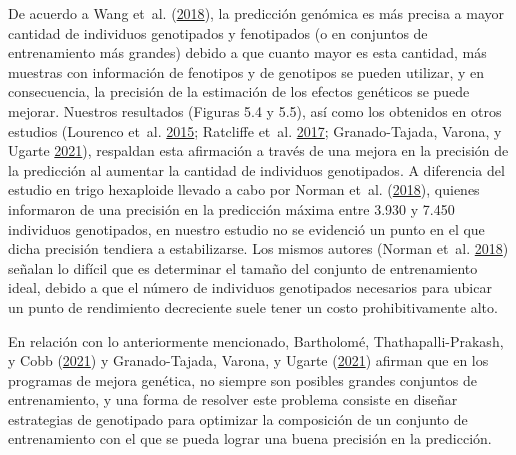\documentclass[11pt,spanish,a4paper,oneside,]{book} %
\begin{document}
De acuerdo a Wang et~al. (\protect\hyperlink{ref-cite:77}{2018}), la predicción genómica es más precisa a mayor cantidad de individuos genotipados y fenotipados (o en conjuntos de entrenamiento más grandes) debido a que cuanto mayor es esta cantidad, más muestras con información de fenotipos y de genotipos se pueden utilizar, y en consecuencia, la precisión de la estimación de los efectos genéticos se puede mejorar. Nuestros resultados (Figuras 5.4 y 5.5), así como los obtenidos en otros estudios (Lourenco et~al. \protect\hyperlink{ref-cite:87}{2015}; Ratcliffe et~al. \protect\hyperlink{ref-cite:72}{2017}; Granado-Tajada, Varona, y Ugarte \protect\hyperlink{ref-cite:88}{2021}), respaldan esta afirmación a través de una mejora en la precisión de la predicción al aumentar la cantidad de individuos genotipados. A diferencia del estudio en trigo hexaploide llevado a cabo por Norman et~al. (\protect\hyperlink{ref-cite:78}{2018}), quienes informaron de una precisión en la predicción máxima entre 3.930 y 7.450 individuos genotipados, en nuestro estudio no se evidenció un punto en el que dicha precisión tendiera a estabilizarse. Los mismos autores (Norman et~al. \protect\hyperlink{ref-cite:78}{2018}) señalan lo difícil que es determinar el tamaño del conjunto de entrenamiento ideal, debido a que el número de individuos genotipados necesarios para ubicar un punto de rendimiento decreciente suele tener un costo prohibitivamente alto.

En relación con lo anteriormente mencionado, Bartholomé, Thathapalli-Prakash, y Cobb (\protect\hyperlink{ref-cite:58}{2021}) y Granado-Tajada, Varona, y Ugarte (\protect\hyperlink{ref-cite:88}{2021}) afirman que en los programas de mejora genética, no siempre son posibles grandes conjuntos de entrenamiento, y una forma de resolver este problema consiste en diseñar estrategias de genotipado para optimizar la composición de un conjunto de entrenamiento con el que se pueda lograr una buena precisión en la predicción.
\end{document}
